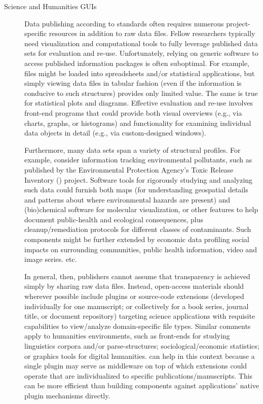 \documentclass[11pt]{article}
\begin{document}
{{\begin{description}
\item[Science and Humanities GUIs]   Data publishing 
according to \FAIRsharing{} standards often requires 
numerous project-specific resources in addition 
to raw data files.  Fellow researchers typically 
need visualization and computational tools to 
fully leverage published data sets for 
evaluation and re-use.  Unfortunately, relying on generic 
software to access published information packages is often 
suboptimal.  For example, \CSV{} files might be 
loaded into spreadsheets and/or statistical applications, 
but simply viewing data files in tabular fashion 
(even if the information is conducive to such structures) 
provides only limited value.  The same is true for 
statistical plots and diagrams.  Effective evaluation 
and re-use involves front-end programs that could provide 
both visual overviews (e.g., via charts, graphs, or histograms) 
and functionality for examining individual data objects 
in detail (e.g., via custom-designed \GUI{} windows).

\pseudoIndent{}  Furthermore, many data sets span a variety of  
structural profiles.  For example, consider information 
tracking environmental pollutants, such as published 
by the Environmental Protection Agency's 
Toxic Release Inventory (\TRI{}) project.
Software tools for rigorously studying and analyzing such data could 
furnish both \GIS{} maps (for understanding 
geospatial details and patterns about where environmental 
hazards are present) and (bio)chemical software 
for molecular visualization, or other features to 
help document public-health and eco\-logical 
consequences, plus cleanup/remediation protocols for 
different classes of contaminants.  Such components 
might be further extended by economic data 
profiling social impacts on surrounding communities, 
public health information, video and image series. etc.

\pseudoIndent{}  In general, then, publishers cannot 
assume that \FAIR{} transparency is achieved simply by 
sharing raw data files.  Instead, open-access materials should 
wherever possible include plugins or source-code extensions (developed 
individually for one manuscript; or collectively 
for a book series, journal title, or document repository) 
targeting science applications with requisite capabilities 
to view/analyze domain-specific file types.  Similar 
comments apply to humanities environments, such as 
front-ends for studying linguistics corpora and/or 
parse-structures; sociological/economic 
statistics; or graphics tools for digital humanities.
\lPacTk{} can help in this context 
because a single \PacTk{} plugin may serve as middleware 
on top of which extensions could operate that are individualized 
to specific publications/manuscripts.  This can be more 
efficient than building components against applications' 
native plugin mechanisms directly. 


\end{description}}}
\end{document}
